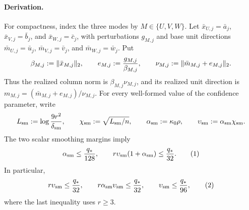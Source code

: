 \paragraph{Derivation.}

For compactness, index the three modes by $M\in\{U,V,W\}$. Let
$\bar x_{U,j}=\bar a_j$, $\bar x_{V,j}=\bar b_j$, and
$\bar x_{W,j}=\bar c_j$, with perturbations $g_{M,j}$ and base unit
directions $\bar m_{U,j}=\bar u_j$,
$\bar m_{V,j}=\bar v_j$, and
$\bar m_{W,j}=\bar w_j$. Put
\[
\beta_{M,j}:=\|\bar x_{M,j}\|_2,\qquad
e_{M,j}:={g_{M,j}\over\beta_{M,j}},\qquad
\nu_{M,j}:=\|\bar m_{M,j}+e_{M,j}\|_2.
\]
Thus the realized column norm is $\beta_{M,j}\nu_{M,j}$, and its
realized unit direction is
$m_{M,j}=(\bar m_{M,j}+e_{M,j})/\nu_{M,j}$.
For every well-formed value of the confidence parameter, write
\[
L_{\rm sm}:=\log {9r^2\over\delta_{\rm sm}},\qquad
\chi_{\rm sm}:=\sqrt{L_{\rm sm}/n},\qquad
\alpha_{\rm sm}:=\kappa _0\rho,\qquad
\upsilon_{\rm sm}:=\alpha_{\rm sm}\chi_{\rm sm}.
\]
The two scalar smoothing margins imply
\[
\alpha_{\rm sm}\le {q_*\over128},\qquad
r\upsilon_{\rm sm}(1+\alpha_{\rm sm})\le {q_*\over32}.
\tag{1}
\]
In particular,
\[
r\upsilon_{\rm sm}\le {q_*\over32},\qquad
r\alpha_{\rm sm}\upsilon_{\rm sm}\le {q_*\over32},\qquad
\upsilon_{\rm sm}\le {q_*\over96},
\tag{2}
\]
where the last inequality uses $r\ge3$.



